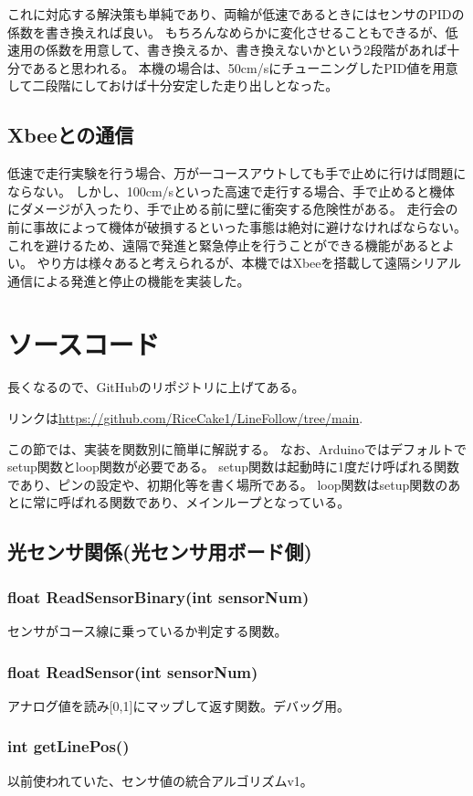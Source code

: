 \documentclass{ltjsreport}
\begin{document}
これに対応する解決策も単純であり、両輪が低速であるときにはセンサのPIDの係数を書き換えれば良い。
もちろんなめらかに変化させることもできるが、低速用の係数を用意して、書き換えるか、書き換えないかという2段階があれば十分であると思われる。
本機の場合は、50cm/sにチューニングしたPID値を用意して二段階にしておけば十分安定した走り出しとなった。

\subsection{Xbeeとの通信}
低速で走行実験を行う場合、万が一コースアウトしても手で止めに行けば問題にならない。
しかし、100cm/sといった高速で走行する場合、手で止めると機体にダメージが入ったり、手で止める前に壁に衝突する危険性がある。
走行会の前に事故によって機体が破損するといった事態は絶対に避けなければならない。
これを避けるため、遠隔で発進と緊急停止を行うことができる機能があるとよい。
やり方は様々あると考えられるが、本機ではXbeeを搭載して遠隔シリアル通信による発進と停止の機能を実装した。


\section{ソースコード}
長くなるので、GitHubのリポジトリに上げてある。

リンクは\url{https://github.com/RiceCake1/LineFollow/tree/main}.

この節では、実装を関数別に簡単に解説する。
なお、Arduinoではデフォルトでsetup関数とloop関数が必要である。
setup関数は起動時に1度だけ呼ばれる関数であり、ピンの設定や、初期化等を書く場所である。
loop関数はsetup関数のあとに常に呼ばれる関数であり、メインループとなっている。

\subsection{光センサ関係(光センサ用ボード側)}
\subsubsection{float ReadSensorBinary(int sensorNum)}
センサがコース線に乗っているか判定する関数。

\subsubsection{float ReadSensor(int sensorNum)}
アナログ値を読み[0,1]にマップして返す関数。デバッグ用。

\subsubsection{int getLinePos()}
以前使われていた、センサ値の統合アルゴリズムv1。
\end{document}
